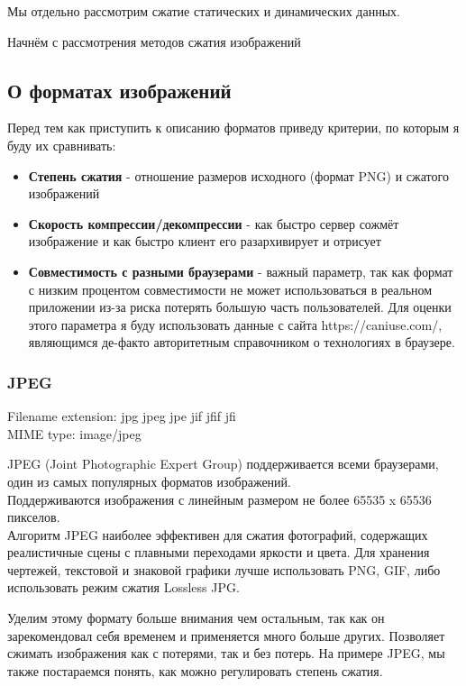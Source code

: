 \documentclass[12pt]{article}
\begin{document}
Мы отдельно рассмотрим сжатие статических и динамических данных.

Начнём с рассмотрения методов сжатия изображений

\subsection{О форматах изображений}

Перед тем как приступить к описанию форматов приведу критерии, по которым я буду их сравнивать:

\begin{itemize}
    \item \textbf{Степень сжатия} - отношение размеров исходного (формат PNG) и сжатого изображений
    \item \textbf{Скорость компрессии/декомпрессии} - как быстро сервер сожмёт изображение и как быстро клиент его разархивирует и отрисует
    \item \textbf{Совместимость с разными браузерами} - важный параметр,
          так как формат с низким процентом совместимости не может использоваться в реальном приложении
          из-за риска потерять большую часть пользователей. Для оценки этого параметра
          я буду использовать данные с сайта https://caniuse.com/, являющимся де-факто авторитетным справочником
          о технологиях в браузере.
\end{itemize}

\subsubsection{JPEG}

Filename extension: jpg jpeg jpe jif jfif jfi \\
MIME type: image/jpeg

JPEG (Joint Photographic Expert Group) поддерживается всеми браузерами,
один из самых популярных форматов изображений. \\
Поддерживаются изображения с линейным размером не более 65535 x 65536 пикселов. \\

Алгоритм JPEG наиболее эффективен для сжатия фотографий, содержащих реалистичные сцены
с плавными переходами яркости и цвета. Для хранения чертежей, текстовой и знаковой
графики лучше использовать PNG, GIF,
либо использовать режим сжатия Lossless JPG.

Уделим этому формату больше внимания чем остальным, так как он зарекомендовал себя временем
и применяется много больше других. Позволяет сжимать изображения как с потерями,
так и без потерь.
На примере JPEG, мы также постараемся понять, как можно регулировать степень сжатия.
\end{document}
